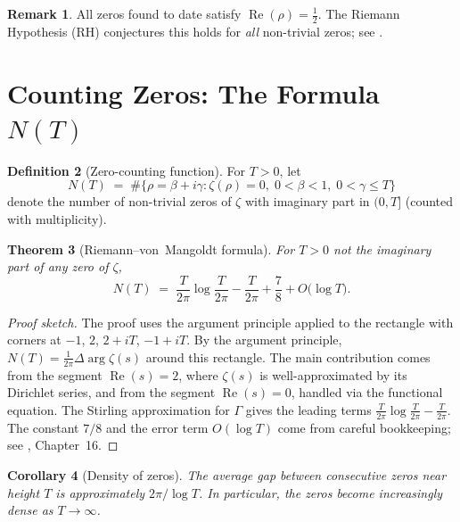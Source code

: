 \documentclass[12pt,a4paper]{amsart}
\newtheorem{theorem}{Theorem}[section]
\newtheorem{corollary}[theorem]{Corollary}
\theoremstyle{definition}
\newtheorem{definition}[theorem]{Definition}
\newtheorem{remark}[theorem]{Remark}
\DeclareMathOperator{\Re}{Re}
\begin{document}
\begin{remark}
All zeros found to date satisfy $\Re(\rho) = \tfrac{1}{2}$.
The Riemann Hypothesis (RH) conjectures this holds for \emph{all} non-trivial
zeros; see \cite{Riemann1859}.
\end{remark}

\section{Counting Zeros: The Formula \texorpdfstring{$N(T)$}{N(T)}}

\begin{definition}[Zero-counting function]
\label{def:NT}
For $T > 0$, let
\[
  N(T) \;=\; \#\bigl\{\rho = \beta + i\gamma : \zeta(\rho) = 0,\;
  0 < \beta < 1,\; 0 < \gamma \le T\bigr\}
\]
denote the number of non-trivial zeros of $\zeta$ with imaginary part
in $(0, T]$ (counted with multiplicity).
\end{definition}

\begin{theorem}[Riemann--von~Mangoldt formula]
\label{thm:NT}
For $T > 0$ not the imaginary part of any zero of $\zeta$,
\begin{equation}
  \label{eq:NT}
  N(T) \;=\; \frac{T}{2\pi}\log\frac{T}{2\pi} - \frac{T}{2\pi}
            + \frac{7}{8} + O\!\bigl(\log T\bigr).
\end{equation}
\end{theorem}

\begin{proof}[Proof sketch]
The proof uses the argument principle applied to the rectangle with
corners at $-1$, $2$, $2+iT$, $-1+iT$.  By the argument principle,
$N(T) = \tfrac{1}{2\pi}\Delta\arg\zeta(s)$ around this rectangle.
The main contribution comes from the segment $\Re(s) = 2$, where
$\zeta(s)$ is well-approximated by its Dirichlet series, and from the
segment $\Re(s) = 0$, handled via the functional equation.
The Stirling approximation for $\Gamma$ gives the leading terms
$\frac{T}{2\pi}\log\frac{T}{2\pi} - \frac{T}{2\pi}$.
The constant $7/8$ and the error term $O(\log T)$ come from careful
bookkeeping; see \cite{Davenport2000}, Chapter~16.
\end{proof}

\begin{corollary}[Density of zeros]
The average gap between consecutive zeros near height $T$ is approximately
$2\pi/\log T$.  In particular, the zeros become increasingly dense as
$T \to \infty$.
\end{corollary}
\end{document}
